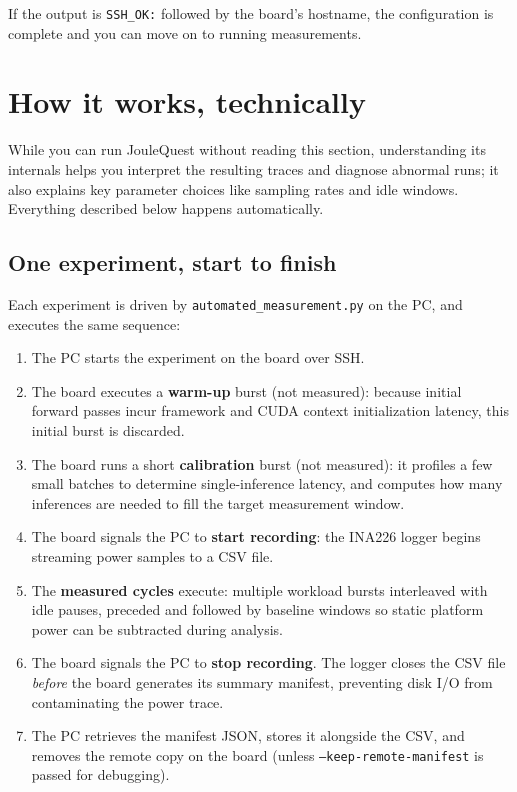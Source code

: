 If the output is \texttt{SSH\_OK:} followed by the board's hostname, the
configuration is complete and you can move on to running measurements.

\section{How it works, technically}

While you can run JouleQuest without reading this section, understanding its internals helps you interpret the resulting traces and diagnose abnormal runs; it also explains key parameter choices like sampling rates and idle windows. Everything described below happens automatically.

\subsection{One experiment, start to finish}

Each experiment is driven by \texttt{automated\_measurement.py} on the PC, and executes the same sequence:

\begin{enumerate}
    \item The PC starts the experiment on the board over SSH.
    \item The board executes a \textbf{warm-up} burst (not measured): because initial forward passes incur framework and CUDA context initialization latency, this initial burst is discarded.
    \item The board runs a short \textbf{calibration} burst (not measured): it profiles a few small batches to determine single-inference latency, and computes how many inferences are needed to fill the target measurement window.
    \item The board signals the PC to \textbf{start recording}: the INA226 logger begins streaming power samples to a CSV file.
    \item The \textbf{measured cycles} execute: multiple workload bursts interleaved with idle pauses, preceded and followed by baseline windows so static platform power can be subtracted during analysis.
    \item The board signals the PC to \textbf{stop recording}. The logger closes the CSV file \emph{before} the board generates its summary manifest, preventing disk I/O from contaminating the power trace.
    \item The PC retrieves the manifest JSON, stores it alongside the CSV, and removes the remote copy on the board (unless \texttt{--keep-remote-manifest} is passed for debugging).
\end{enumerate}

